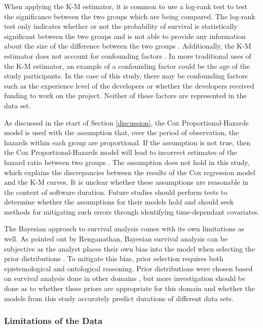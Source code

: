 \documentclass[sigconf]{acmart}
\begin{document}
When applying the K-M estimator, it is common to use a log-rank test to test the significance between the two groups which are being compared.
The log-rank test only indicates whether or not the probability of survival is statistically significant between the two groups and is not able to provide any information about the size of the difference between the two groups \cite{stel2011kaplan}.
Additionally, the K-M estimator does not account for confounding factors \cite{stel2011kaplan}.
In more traditional uses of the K-M estimator, an example of a confounding factor could be the age of the study participants.
In the case of this study, there may be confounding factors such as the experience level of the developers or whether the developers received funding to work on the project.
Neither of these factors are represented in the data set.

As discussed in the start of Section \ref{discussion}, the Cox Proportional-Hazards model is used with the assumption that, over the period of observation, the hazards within each group are proportional.
If the assumption is not true, then the Cox Proportional-Hazards model will lead to incorrect estimates of the hazard ratio between two groups \cite{stel2011cox}.
The assumption does not hold in this study, which explains the discrepancies between the results of the Cox regression model and the K-M curves.
It is unclear whether these assumptions are reasonable in the context of software duration.
Future studies should perform tests to determine whether the assumptions for their models hold and should seek methods for mitigating such errors through identifying time-dependant covariates.

The Bayesian approach to survival analysis comes with its own limitations as well.
As pointed out by Renganathan, Bayesian survival analysis can be subjective as the analyst places their own bias into the model when selecting the prior distributions \cite{renganathan2016overview}.
To mitigate this bias, prior selection requires both epistemological and ontological reasoning.
Prior distributions were chosen based on survival analysis done in other domains \cite{kelter2020bayesian, rethinking}, but more investigation should be done as to whether these priors are appropriate for this domain and whether the models from this study accurately predict durations of different data sets.

\subsubsection{Limitations of the Data}
\end{document}

